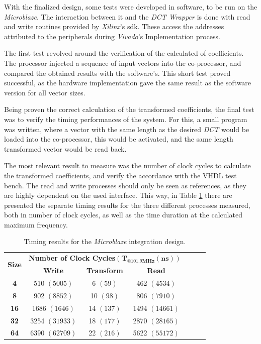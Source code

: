 With the finalized design, some tests were developed in software, to be run on the \emph{Microblaze}. The interaction between it and the \emph{DCT Wrapper} is done with read and write routines provided by \emph{Xilinx}'s \gls{sdk}. These access the addresses attributed to the peripherals during \emph{Vivado}'s Implementation process.

The first test revolved around the verification of the calculated of coefficients. The processor injected a sequence of input vectors into the co-processor, and compared the obtained results with the software's. This short test proved successful, as the hardware implementation gave the same result as the software version for all vector sizes.

Being proven the correct calculation of the transformed coefficients, the final test was to verify the timing performances of the system. For this, a small program was written, where a vector with the same length as the desired \emph{DCT} would be loaded into the co-processor, this would be activated, and the same length transformed vector would be read back.

The most relevant result to measure was the number of clock cycles to calculate the transformed coefficients, and verify the accordance with the VHDL test bench. The read and write processes should only be seen as references, as they are highly dependent on the used interface. This way, in Table \ref{tab:axi4time} there are presented the separate timing results for the three different processes measured, both in number of clock cycles, as well as the time duration at the calculated maximum frequency. 

\begin{table}[!htpb]
    \centering
    \caption{Timing results for the \emph{Microblaze} integration design.}
    \begin{tabular}{ccccccc} \toprule
        \multirow{2}{*}{\textbf{Size}}   & \multicolumn{3}{c}{\textbf{Number of Clock Cycles}$\mathbf{(T_{@101.9MHz}(ns))}$}                      \\
                                         & \textbf{Write} & \textbf{Transform} & \textbf{Read}  \\ \toprule
        \textbf{4}                       & 510 $(5005)$   & 6 $(59)$           & 462 $(4534)$   \\
        \textbf{8}                       & 902 $(8852)$   & 10 $(98)$          & 806 $(7910)$   \\
        \textbf{16}                      & 1686 $(1646)$  & 14 $(137)$         & 1494 $(14661)$ \\
        \textbf{32}                      & 3254 $(31933)$ & 18 $(177)$         & 2870 $(28165)$ \\
        \textbf{64}                      & 6390 $(62709)$ & 22 $(216)$         & 5622 $(55172)$ \\
        \bottomrule
    \end{tabular}
    \label{tab:axi4time}
\end{table}

